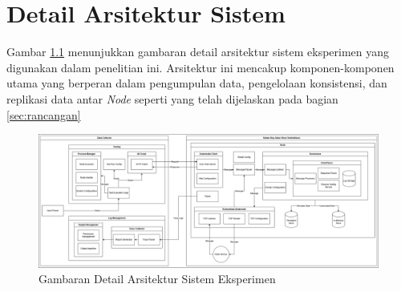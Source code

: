 \chapter{Detail Arsitektur Sistem}
\label{appendix:detailed-architecture}

Gambar \ref{fig:detailed-architecture} menunjukkan gambaran detail arsitektur sistem eksperimen yang digunakan dalam penelitian ini. Arsitektur ini mencakup komponen-komponen utama yang berperan dalam pengumpulan data, pengelolaan konsistensi, dan replikasi data antar \textit{Node} seperti yang telah dijelaskan pada bagian \ref{sec:rancangan}

\begin{figure}[ht]
    \centering
    \includegraphics[width=\textwidth]{resources/appendix/detailed-architecture.png}
    
    \caption{Gambaran Detail Arsitektur Sistem Eksperimen}
    \label{fig:detailed-architecture}
\end{figure}